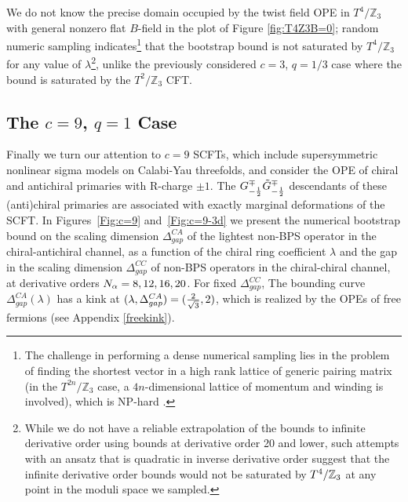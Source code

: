 \documentclass[12pt]{article}
\begin{document}
We do not know the precise domain occupied by the twist field OPE in $T^4/\mathbb{Z}_3$ with general nonzero flat $B$-field in the plot of Figure \ref{fig:T4Z3B=0}; random numeric sampling indicates\footnote{The challenge in performing a dense numerical sampling lies in the problem of finding the shortest vector in a high rank lattice of generic pairing matrix (in the $T^{2n}/\mathbb{Z}_3$ case, a $4n$-dimensional lattice of momentum and winding is involved), which is NP-hard \cite{SVP}.} that the bootstrap bound is not saturated by $T^4/\mathbb{Z}_3$ for any value of $\lambda$\footnote{While we do not have a reliable extrapolation of the bounds to infinite derivative order using bounds at derivative order 20 and lower, such attempts with an ansatz that is quadratic in inverse derivative order suggest that 
the infinite derivative order bounds would not be saturated by $T^4/\mathbb{Z}_3$ at any point in the moduli space we sampled.
}, unlike the previously considered $c=3$, $q=1/3$ case where the bound is saturated by the $T^2/\mathbb{Z}_3$ CFT. 





%

\subsection{The $c=9$, $q=1$ Case}



Finally we turn our attention to $c = 9$ SCFTs, which include supersymmetric nonlinear sigma models on Calabi-Yau threefolds, and consider the OPE of chiral and antichiral primaries with R-charge $\pm1$.  The $G^\mp_{-{1\over2}} \tilde{G}^\mp_{-{1\over2}}$ descendants of these (anti)chiral primaries are associated with exactly marginal deformations of the SCFT. %
In Figures~\ref{Fig:c=9} and~\ref{Fig:c=9-3d} we present the numerical bootstrap bound on the scaling dimension $\Delta^{CA}_{gap}$ of the lightest non-BPS operator in the chiral-antichiral channel, as a function of the chiral ring coefficient $\lambda$ and the gap in the scaling dimension $\Delta^{CC}_{gap}$ of non-BPS operators in the chiral-chiral channel, at derivative orders $N_{\alpha}=8, 12, 16, 20$.
For fixed $\Delta_{gap}^{CC}$, The bounding curve $\Delta_{gap}^{CA}(\lambda)$ has a kink at $(\lambda, \Delta^{CA}_{gap}) = ({2\over\sqrt3}, 2)$, which is realized by the OPEs of free fermions (see Appendix \ref{freekink}).
\end{document}
